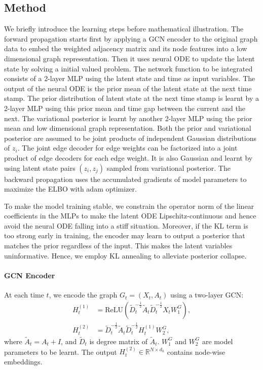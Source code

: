 \subsection{Method}

We briefly introduce the learning steps before mathematical illustration. 
The forward propagation starts first by applying a GCN encoder to the original graph data to embed the weighted adjacency matrix and its node features into a low dimensional graph representation. 
Then it uses neural ODE to update the latent state by solving a initial valued problem. 
The network function to be integrated consists of a 2-layer MLP using the latent state and time as input variables. 
The output of the neural ODE is the prior mean of the latent state at the next time stamp.  
The prior distribution of latent state at the next time stamp is learnt by a 2-layer MLP using this prior mean and time gap between the current and the next. 
The variational posterior is learnt by another 2-layer MLP using the prior mean and low dimensional graph representation. 
Both the prior and variational posterior are assumed to be joint products of independent Gaussian distributions of $z_i$. 
The joint edge decoder for edge weights can be factorized into a joint product of edge decoders for each edge weight. 
It is also Gaussian and learnt by using latent state pairs $(z_i,z_j)$ sampled from variational posterior. 
The backward propagation uses the accumulated gradients of model parameters to maximize the ELBO 
with adam optimizer.

To make the model training stable,  
we constrain the operator norm of the linear coefficients in the MLPs to make the latent ODE Lipschitz-continuous 
and hence avoid the neural ODE falling into a stiff situation. 
Moreover, if the KL term is too strong early in training, the encoder may learn to output a posterior that matches the prior regardless of the input.
This makes the latent variables uninformative. Hence, we employ KL annealing to alleviate posterior collapse. 

\paragraph{GCN Encoder}

At each time $t$, we encode the graph $G_t=(X_t,A_t)$ using a two-layer GCN:
\begin{align*}
    H^{(1)}_t &= \mathrm{ReLU}(\tilde{D}_t^{-\frac12}\tilde{A}_t\tilde{D}_t^{-\frac12}X_t W^G_1), \\
    H^{(2)}_t &= \tilde{D}_t^{-\frac12}\tilde{A}_t\tilde{D}_t^{-\frac12}H^{(1)}_t W^G_2,
\end{align*}
where $\tilde{A}_t=A_t+I$, and $\tilde{D}_t$ is degree matrix of $\tilde{A}_t$. 
$W^G_1$ and $W^G_2$ are model parameters to be learnt. 
The output $H^{(2)}_t\in \mathbb{R}^{N\times d_h}$ contains node-wise embeddings.

